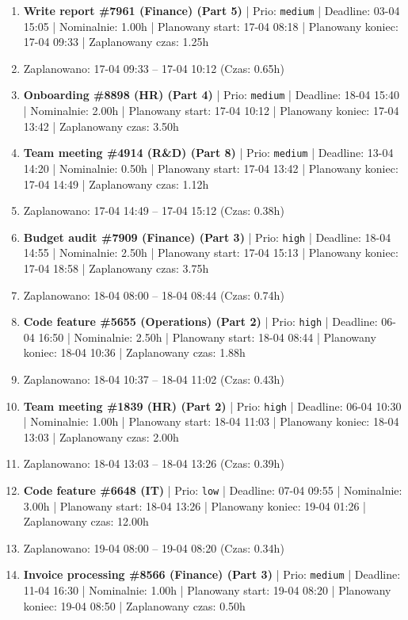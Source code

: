 {\begin{enumerate}
  \item [\textbf{14657}] \textbf{Write report \#7961 (Finance) (Part 5)} | Prio: \texttt{medium} | Deadline: 03-04 15:05 | Nominalnie: 1.00h | Planowany start: 17-04 08:18 | Planowany koniec: 17-04 09:33 | Zaplanowany czas: 1.25h
  \item [\textbf{PRZERWA}] Zaplanowano: 17-04 09:33 -- 17-04 10:12 (Czas: 0.65h)
  \item [\textbf{14636}] \textbf{Onboarding \#8898 (HR) (Part 4)} | Prio: \texttt{medium} | Deadline: 18-04 15:40 | Nominalnie: 2.00h | Planowany start: 17-04 10:12 | Planowany koniec: 17-04 13:42 | Zaplanowany czas: 3.50h
  \item [\textbf{14638}] \textbf{Team meeting \#4914 (R\&D) (Part 8)} | Prio: \texttt{medium} | Deadline: 13-04 14:20 | Nominalnie: 0.50h | Planowany start: 17-04 13:42 | Planowany koniec: 17-04 14:49 | Zaplanowany czas: 1.12h
  \item [\textbf{PRZERWA}] Zaplanowano: 17-04 14:49 -- 17-04 15:12 (Czas: 0.38h)
  \item [\textbf{14616}] \textbf{Budget audit \#7909 (Finance) (Part 3)} | Prio: \texttt{high} | Deadline: 18-04 14:55 | Nominalnie: 2.50h | Planowany start: 17-04 15:13 | Planowany koniec: 17-04 18:58 | Zaplanowany czas: 3.75h
  \item [\textbf{PRZERWA}] Zaplanowano: 18-04 08:00 -- 18-04 08:44 (Czas: 0.74h)
  \item [\textbf{14626}] \textbf{Code feature \#5655 (Operations) (Part 2)} | Prio: \texttt{high} | Deadline: 06-04 16:50 | Nominalnie: 2.50h | Planowany start: 18-04 08:44 | Planowany koniec: 18-04 10:36 | Zaplanowany czas: 1.88h
  \item [\textbf{PRZERWA}] Zaplanowano: 18-04 10:37 -- 18-04 11:02 (Czas: 0.43h)
  \item [\textbf{14610}] \textbf{Team meeting \#1839 (HR) (Part 2)} | Prio: \texttt{high} | Deadline: 06-04 10:30 | Nominalnie: 1.00h | Planowany start: 18-04 11:03 | Planowany koniec: 18-04 13:03 | Zaplanowany czas: 2.00h
  \item [\textbf{PRZERWA}] Zaplanowano: 18-04 13:03 -- 18-04 13:26 (Czas: 0.39h)
  \item [\textbf{14683}] \textbf{Code feature \#6648 (IT)} | Prio: \texttt{low} | Deadline: 07-04 09:55 | Nominalnie: 3.00h | Planowany start: 18-04 13:26 | Planowany koniec: 19-04 01:26 | Zaplanowany czas: 12.00h
  \item [\textbf{PRZERWA}] Zaplanowano: 19-04 08:00 -- 19-04 08:20 (Czas: 0.34h)
  \item [\textbf{14675}] \textbf{Invoice processing \#8566 (Finance) (Part 3)} | Prio: \texttt{medium} | Deadline: 11-04 16:30 | Nominalnie: 1.00h | Planowany start: 19-04 08:20 | Planowany koniec: 19-04 08:50 | Zaplanowany czas: 0.50h

\end{enumerate}}
